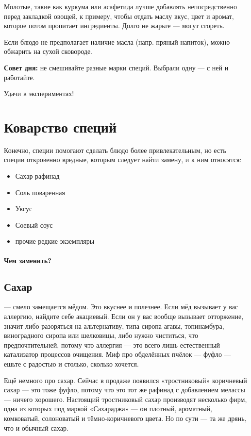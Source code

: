 Молотые, такие как куркума или асафетида лучше добавлять непосредственно перед закладкой овощей, к примеру, чтобы отдать маслу вкус, цвет и аромат, которое потом пропитает ингредиенты. Долго не жарьте — могут сгореть.

Если блюдо не предполагает наличие масла (напр. пряный напиток), можно обжарить на сухой сковороде.

\textbf{Совет дня:} не смешивайте разные марки специй. Выбрали одну — с ней и работайте.

Удачи в экспериментах!


\section{Коварство специй}\label{sec:replace}

Конечно, специи помогают сделать блюдо более привлекательным, но есть специи откровенно вредные, которым следует найти замену, и к ним относятся:
\begin{itemize}
\item Сахар рафинад
\item Соль поваренная
\item Уксус
\item Соевый соус
\item прочие редкие экземпляры
\end{itemize}

\paragraph{Чем заменить?}

\subsection{Сахар}

— смело замещается мёдом. Это вкуснее и полезнее.
Если мёд вызывает у вас аллергию, найдите себе акациевый. Если он у вас вообще вызывает отторжение, значит либо разоряться на альтернативу, типа сиропа агавы, топинамбура, виноградного сиропа или шелковицы, либо нужно чиститься, что предпочтительней, потому что аллергия — это всего лишь естественный катализатор процессов очищения. Миф про обделённых пчёлок — фуфло — ешьте с радостью и столько, сколько хочется.

Ещё немного про сахар. Сейчас в продаже появился «тростниковый» коричневый сахар — это тоже фуфло, потому что это тот же рафинад с добавлением мелассы — ничего хорошего. Настоящий тростниковый сахар производят несколько фирм, одна из которых под маркой «Сахараджа» — он плотный, ароматный, комковатый, солоноватый и тёмно-коричневого цвета. Но по сути — та же дрянь, что и обычный сахар.

